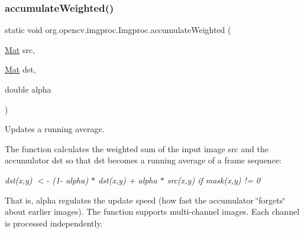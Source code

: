 \subsubsection{\texorpdfstring{accumulate\+Weighted()}{accumulateWeighted()}\hspace{0.1cm}{\footnotesize\ttfamily [2/2]}}
{\footnotesize\ttfamily static void org.\+opencv.\+imgproc.\+Imgproc.\+accumulate\+Weighted (\begin{DoxyParamCaption}\item[{\mbox{\hyperlink{classorg_1_1opencv_1_1core_1_1_mat}{Mat}}}]{src,  }\item[{\mbox{\hyperlink{classorg_1_1opencv_1_1core_1_1_mat}{Mat}}}]{dst,  }\item[{double}]{alpha }\end{DoxyParamCaption})\hspace{0.3cm}{\ttfamily [static]}}

Updates a running average.

The function calculates the weighted sum of the input image {\ttfamily src} and the accumulator {\ttfamily dst} so that {\ttfamily dst} becomes a running average of a frame sequence\+:

{\itshape dst(x,y) $<$-\/ (1-\/ alpha) $\ast$ dst(x,y) + alpha $\ast$ src(x,y) if mask(x,y) != 0}

That is, {\ttfamily alpha} regulates the update speed (how fast the accumulator \char`\"{}forgets\char`\"{} about earlier images). The function supports multi-\/channel images. Each channel is processed independently.


